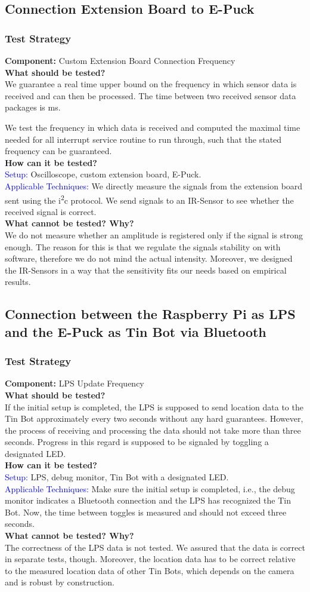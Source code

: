 \documentclass[a4paper,parskip,headheight=38pt]{scrartcl} %
\newcommand{\teststrat}[5]{
    \subsubsection{Test Strategy}
	\textbf{Component:} #1 \\
	\noindent\textbf{What should be tested?} \\
    \noindent #2 \\
	\noindent\textbf{How can it be tested?} \\
    \noindent\textcolor{blue}{Setup:} #3 \\
    \noindent\textcolor{blue}{Applicable Techniques:} #4 \\
	\noindent\textbf{What cannot be tested? Why?} \\
    \noindent #5
}
\newcommand{\ie}{i.e.}
\begin{document}
\subsection{Connection Extension Board to E-Puck}

\teststrat{Custom Extension Board Connection Frequency}{
    We guarantee a real time upper bound on the frequency in which sensor data
    is received and can then be processed. The time between two received
    sensor data packages is \todo[inline]{FREQUENCY}ms.

    We test the frequency in which data is received and computed the maximal
    time needed for all interrupt service routine to run through, such that the
    stated frequency can be guaranteed.
}{
    Oscilloscope, custom extension board, E-Puck.
}{
    We directly measure the signals from the extension board sent using the
    i\textsuperscript{2}c protocol. We send signals to an IR-Sensor to see
    whether the received signal is correct.
}{
   We do not measure whether an amplitude is registered only if the signal is
   strong enough. The reason for this is that we regulate the signals stability
   on with software, therefore we do not mind the actual intensity. Moreover, we
   designed the IR-Sensors in a way that the sensitivity fits our needs based on
   empirical results.
}

\subsection{Connection between the Raspberry Pi as LPS and the E-Puck as Tin Bot
via Bluetooth}

\teststrat{LPS Update Frequency}{
    If the initial setup is completed, the LPS is supposed to send location data
    to the Tin Bot approximately every two seconds without any hard guarantees.
    However, the process of receiving and processing the data should not take
    more than three seconds. Progress in this regard is supposed to be signaled
    by toggling a designated LED.
}{
    LPS, debug monitor, Tin Bot with a designated LED.
}{
    Make sure the initial setup is completed, \ie, the debug monitor indicates a
    Bluetooth connection and the LPS has recognized the Tin Bot. Now, the time
    between toggles is measured and should not exceed three seconds.
}{
    The correctness of the LPS data is not tested. We assured that the data is
    correct in separate tests, though. Moreover, the location data has to be
    correct relative to the measured location data of other Tin Bots, which
    depends on the camera and is robust by construction.
}
\end{document}
